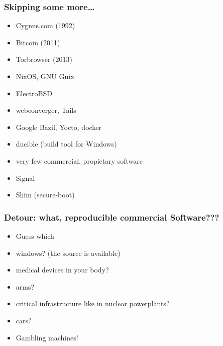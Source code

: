\documentclass[14pt]{beamer}
\begin{document}
\begin{frame}
 \frametitle{Skipping some more…}
 \begin{itemize}
\item Cygnus.com (1992)
\item Bitcoin (2011)
\item Torbrowser (2013)
\item<2-3> NixOS, GNU Guix
\item<2-3> ElectroBSD
\item<2-3> webconverger, Tails
\item<2-3> Google Bazil, Yocto, docker
\item<3> ducible (build tool for Windows)
\item<3> very few commercial, propietary software
\item<3> Signal
\item<3> Shim (secure-boot)
 \end{itemize}
\end{frame}


\begin{frame}
 \frametitle{Detour: what, reproducible commercial Software???}
 \begin{itemize}
\item Guess which
\item <2-3>   windows? (the source is available)
\item <2-3>   medical devices in your body?
\item <2-3>   arms?
\item <2-3>   critical infrastructure like in nuclear powerplants?
\item <2-3>   cars?
\item <3> Gambling machines!
 \end{itemize}
\end{frame}
\end{document}
